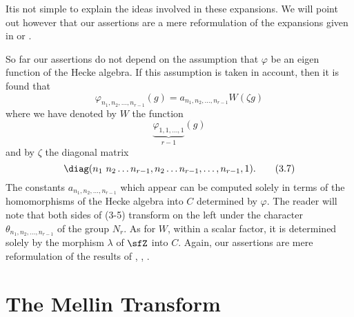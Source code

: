 It\pageoriginale is not simple to explain the ideas involved in these expansions. We will point out however that our assertions are a mere reformulation of the expansions given in \cite{art5-P1} or \cite{art5-Sha}.

So far our assertions do not depend on the assumption that $\varphi$ be an eigen function of the Hecke algebra. If this assumption is taken in account, then it is found that
\begin{equation*}
\varphi_{n_{1},n_{2},\ldots,n_{r-1}}(g)=a_{n_{1},n_{2},\ldots,n_{r-1}}W(\zeta g)\tag{3.5}\label{art5-eq3.5}
\end{equation*}
where we have denoted by $W$ the function
\begin{equation*}
\underbrace{\varphi_{1,1,\ldots,1}}_{r-1}(g)\tag{3.6}\label{art5-eq3.6}
\end{equation*}
and by $\zeta$ the diagonal matrix
\begin{equation*}
\diag (n_{1} \ n_{2}\ldots n_{r-1}, n_{2}\ldots n_{r-1},\ldots,n_{r-1},1).\tag{3.7}\label{art5-eq3.7}
\end{equation*}
The constants $a_{n_{1},n_{2},\ldots,n_{r-1}}$ which appear can be computed solely in terms of the homomorphisms of the Hecke algebra into $C$ determined by $\varphi$. The reader will note that both sides of (3-5) transform on the left under the character $\theta_{n_{1},n_{2},\ldots,n_{r-1}}$ of the group $N_{r}$. As for $W$, within a scalar factor, it is determined solely by the morphism $\lambda$ of $\sfZ$ into $C$. Again, our assertions are mere reformulation of the results of \cite{art5-C-S}, \cite{art5-Sha}, \cite{art5-Shi}.

\section{The Mellin Transform}\label{art5-sec4}

